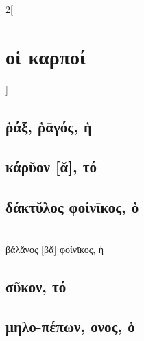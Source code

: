 \documentclass{book}
\begin{document}
\begin{multicols}{2}[\section{οἱ καρποί}]
\subsection{ῥάξ, ῥᾱγός, ἡ}
\subsection{κάρῠον [ᾰ], τό}
\subsection{δάκτῠλος φοίνῑκος, ὁ}
 ~\\
βάλᾰνος [βᾰ] φοίνῑκος, ἡ
\subsection{σῦκον, τό}
\subsection{μηλο-πέπων, ονος, ὁ}
~
\end{multicols}
\newpage  
\end{document}
